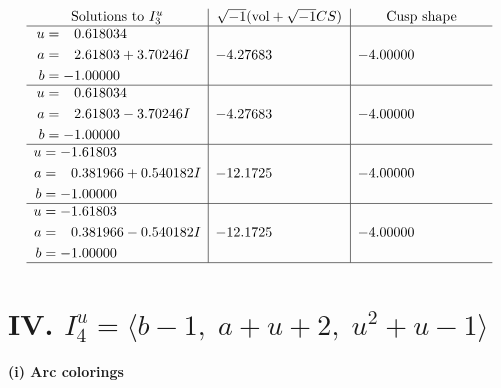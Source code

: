 \documentclass[1p]{elsarticle_modified}
\theoremstyle{definition}
\newcommand{\I}{\sqrt{-1}}
\begin{document}
$$\begin{array}{c|c|c}  
\text{Solutions to }I^u_{3}& \I (\text{vol} + \sqrt{-1}CS) & \text{Cusp shape}\\
 \hline 
\begin{aligned}
u &= \phantom{-}0.618034\phantom{ +0.000000I} \\
a &= \phantom{-}2.61803 + 3.70246 I \\
b &= -1.00000\phantom{ +0.000000I}\end{aligned}
 & -4.27683\phantom{ +0.000000I} & -4.00000\phantom{ +0.000000I} \\ \hline\begin{aligned}
u &= \phantom{-}0.618034\phantom{ +0.000000I} \\
a &= \phantom{-}2.61803 - 3.70246 I \\
b &= -1.00000\phantom{ +0.000000I}\end{aligned}
 & -4.27683\phantom{ +0.000000I} & -4.00000\phantom{ +0.000000I} \\ \hline\begin{aligned}
u &= -1.61803\phantom{ +0.000000I} \\
a &= \phantom{-}0.381966 + 0.540182 I \\
b &= -1.00000\phantom{ +0.000000I}\end{aligned}
 & -12.1725\phantom{ +0.000000I} & -4.00000\phantom{ +0.000000I} \\ \hline\begin{aligned}
u &= -1.61803\phantom{ +0.000000I} \\
a &= \phantom{-}0.381966 - 0.540182 I \\
b &= -1.00000\phantom{ +0.000000I}\end{aligned}
 & -12.1725\phantom{ +0.000000I} & -4.00000\phantom{ +0.000000I}\\
 \hline 
 \end{array}$$\newpage\newpage\renewcommand{\arraystretch}{1}
\centering \section*{IV. $I^u_{4}= \langle b-1,\;a+u+2,\;u^2+u-1 \rangle$}
\flushleft \textbf{(i) Arc colorings}\\
\end{document}
